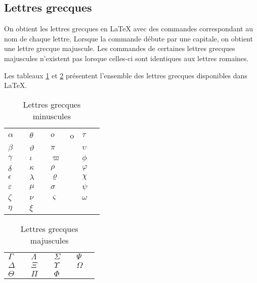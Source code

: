 \subsection{Lettres grecques}
\label{sec:math:symboles:grecques}

On obtient les lettres grecques en {\LaTeX} avec des commandes
correspondant au nom de chaque lettre. Lorsque la commande débute par
une capitale, on obtient une lettre grecque majuscule. Les commandes
de certaines lettres grecques majuscules n'existent pas lorsque celles-ci
sont identiques aux lettres romaines.

Les tableaux \ref{tab:math:grecques} et \ref{tab:math:Grecques}
présentent l'ensemble des lettres grecques disponibles dans {\LaTeX}.

\begin{table}
  \caption{Lettres grecques minuscules}
  \label{tab:math:grecques}
  \begin{tabularx}{1.0\linewidth}{lXlXlXlX}
    $\alpha$      & \cmd{\alpha}      & $\theta$    & \cmd{\theta} &
    $o$           & o                 & $\tau$      & \cmd{\tau} \\
    $\beta$       & \cmd{\beta}       & $\vartheta$ & \cmd{\vartheta} &
    $\pi$         & \cmd{\pi}         & $\upsilon$  & \cmd{\upsilon} \\
    $\gamma$      & \cmd{\gamma}      & $\iota$     & \cmd{\iota} &
    $\varpi$      & \cmd{\varpi}      & $\phi$      & \cmd{\phi} \\
    $\delta$      & \cmd{\delta}      & $\kappa$    & \cmd{\kappa} &
    $\rho$        & \cmd{\rho}        & $\varphi$   & \cmd{\varphi} \\
    $\epsilon$    & \cmd{\epsilon}    & $\lambda$   & \cmd{\lambda} &
    $\varrho$     & \cmd{\varrho}     & $\chi$      & \cmd{\chi} \\
    $\varepsilon$ & \cmd{\varepsilon} & $\mu$       & \cmd{\mu} &
    $\sigma$      & \cmd{\sigma}      & $\psi$      & \cmd{\psi} \\
    $\zeta$       & \cmd{\zeta}       & $\nu$       & \cmd{\nu} &
    $\varsigma$   & \cmd{\varsigma}   & $\omega$    & \cmd{\omega} \\
    $\eta$        & \cmd{\eta}        & $\xi$       & \cmd{\xi}
  \end{tabularx}
\end{table}

\begin{table}
  \caption{Lettres grecques majuscules}
  \label{tab:math:Grecques}
  \begin{tabularx}{1.0\linewidth}{lXlXlXlX}
    $\Gamma$    & \cmd{\Gamma}   &
    $\Lambda$   & \cmd{\Lambda}  &
    $\Sigma$    & \cmd{\Sigma}   &
    $\Psi$      & \cmd{\Psi}     \\
    $\Delta$    & \cmd{\Delta}   &
    $\Xi$       & \cmd{\Xi}      &
    $\Upsilon$  & \cmd{\Upsilon} &
    $\Omega$    & \cmd{\Omega}   \\
    $\Theta$    & \cmd{\Theta}   &
    $\Pi$       & \cmd{\Pi}      &
    $\Phi$      & \cmd{\Phi}
  \end{tabularx}
\end{table}

